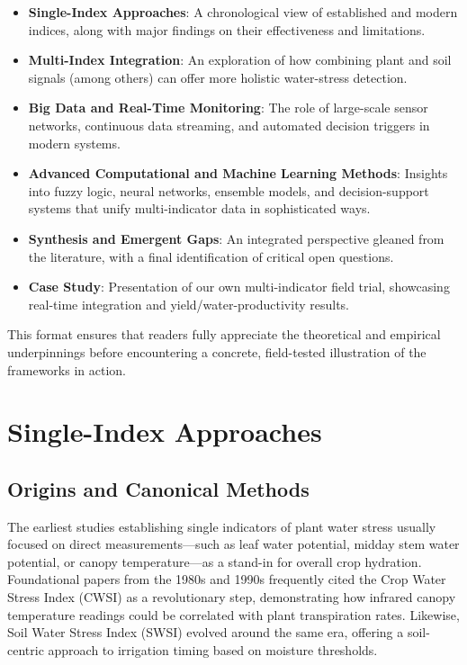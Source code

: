 \documentclass[12pt]{article}
\begin{document}
\begin{itemize}
\item \textbf{Single-Index Approaches}: A chronological view of established and modern indices, along with major findings on their effectiveness and limitations.
\item \textbf{Multi-Index Integration}: An exploration of how combining plant and soil signals (among others) can offer more holistic water-stress detection.
\item \textbf{Big Data and Real-Time Monitoring}: The role of large-scale sensor networks, continuous data streaming, and automated decision triggers in modern systems.
\item \textbf{Advanced Computational and Machine Learning Methods}: Insights into fuzzy logic, neural networks, ensemble models, and decision-support systems that unify multi-indicator data in sophisticated ways.
\item \textbf{Synthesis and Emergent Gaps}: An integrated perspective gleaned from the literature, with a final identification of critical open questions.
\item \textbf{Case Study}: Presentation of our own multi-indicator field trial, showcasing real-time integration and yield/water-productivity results.
\end{itemize}

This format ensures that readers fully appreciate the theoretical and empirical underpinnings before encountering a concrete, field-tested illustration of the frameworks in action.



\section{Single-Index Approaches}

\subsection{Origins and Canonical Methods}
The earliest studies establishing single indicators of plant water stress usually focused on direct measurements—such as leaf water potential, midday stem water potential, or canopy temperature—as a stand-in for overall crop hydration. Foundational papers from the 1980s and 1990s frequently cited the Crop Water Stress Index (CWSI) as a revolutionary step, demonstrating how infrared canopy temperature readings could be correlated with plant transpiration rates. Likewise, Soil Water Stress Index (SWSI) evolved around the same era, offering a soil-centric approach to irrigation timing based on moisture thresholds.
\end{document}
